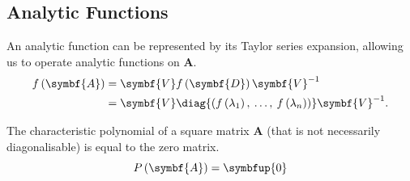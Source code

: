 \documentclass{article}
\begin{document}
\subsection{Analytic Functions}
An analytic function can be represented by its Taylor series expansion,
allowing us to operate analytic functions on \(\symbf{A}\).
\begin{align*}
    f\left( \symbf{A} \right) & = \symbf{V} f\left( \symbf{D} \right) \symbf{V}^{-1}                                                               \\
                              & = \symbf{V} \diag{\left( f\left( \lambda_1 \right),\: \ldots,\: f\left( \lambda_n \right) \right)} \symbf{V}^{-1}.
\end{align*}
\begin{theorem}
    The characteristic polynomial of a square matrix \(\symbf{A}\) (that is not necessarily diagonalisable)
    is equal to the zero matrix.
    \begin{equation*}
        P\left( \symbf{A} \right) = \symbfup{0}
    \end{equation*}
\end{theorem}
\end{document}
